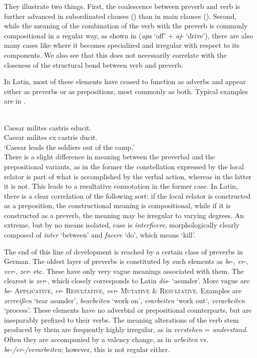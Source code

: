 \noindent They illustrate two things. First, the coalescence between preverb and verb is further advanced in subordinated clauses () than in main clauses (). Second, while the meaning of the combination of the verb with the preverb is commonly compositional in a regular way, as shown in  (\textit{apa} ‘off’ + \textit{aj}{}- ‘drive’), there are also many cases like  where it becomes specialized and irregular with respect to its components. We also see that this does not necessarily correlate with the closeness of the structural bond between verb and preverb.

In Latin, most of these elements have ceased to function as adverbs and appear either as preverbs or as prepositions, most commonly as both. Typical examples are in .

\ea\label{ex:E80}
 \\
 \ea 
 Caesar milites castris educit.\\

\ex Caesar milites ex castris ducit.\\
\glt ‘Caesar leads the soldiers out of the camp.’\\
\z
\z
\noindent There is a slight difference in meaning between the preverbal and the prepositional variants, as in the former the constellation expressed by the local relator is part of what is accomplished by the verbal action, whereas in the latter it is not. This leads to a resultative connotation in the former case. In Latin, there is a clear correlation of the following sort: if the local relator is constructed as a preposition, the constructional meaning is compositional, while if it is constructed as a preverb, the meaning may be irregular to varying degrees. An extreme, but by no means isolated, case is \textit{interficere}, morphologically clearly composed of \textit{inter} ‘between’ and \textit{facere} ‘do’, which means ‘kill’.

The end of this line of development is reached by a certain class of preverbs in German. The oldest layer of preverbs is constituted by such elements as \textit{be}{}-, \textit{er}{}-, \textit{ver}{}-, \textit{zer}{}- etc. These have only very vague meanings associated with them. The clearest is \textit{zer}{}-, which closely corresponds to Latin \textit{dis}{}- ‘asunder’. More vague are \textit{be}{}- \textsc{Applicative}, \textit{er}{}- \textsc{Resultative}, \textit{ver}{}- \textsc{Mutative} \& \textsc{Resultative}. Examples are \textit{zerreißen} ‘tear asunder’, \textit{bearbeiten} ‘work on’, \textit{erarbeiten} ‘work out’, \textit{verarbeiten} ‘process’. These elements have no adverbial or prepositional counterparts, but are inseparably prefixed to their verbs. The meaning alterations of the verb stem produced by them are frequently highly irregular, as in \textit{verstehen} = \textit{understand}. Often they are accompanied by a valency change, as in \textit{arbeiten} vs. \textit{be-/er-/verarbeiten}; however, this is not regular either.

